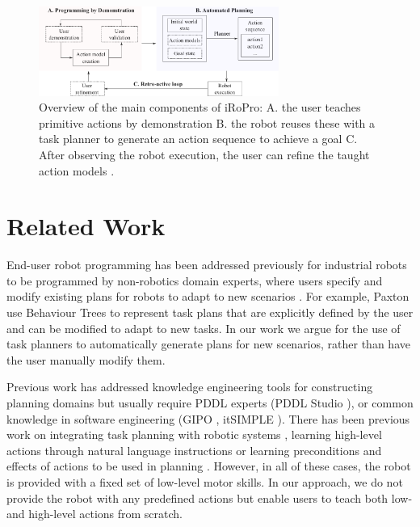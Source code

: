 \begin{figure}
	\centering
	\includegraphics[width=0.7\textwidth]{Fig5.png}
	\caption{Overview of the main components of iRoPro: A. the user teaches primitive actions by demonstration B. the robot reuses these with a task planner to generate an action sequence to achieve a goal
		C. After observing the robot execution, the user can refine the taught action models \cite{liang2017b}.}
	\label{fig:framework}
\end{figure}

\section{Related Work} \label{sec:relatedwork}
End-user robot programming has been addressed previously for industrial robots to be programmed by non-robotics domain experts, where users specify and modify existing plans for robots to adapt to new scenarios \cite{paxton2017costar,perzylo2016intuitive,stenmark2017simplified}.
For example, Paxton \etal \cite{paxton2017costar} use Behaviour Trees to represent task plans that are explicitly defined by the user and can be modified to adapt to new tasks.
In our work we argue for the use of task planners to automatically generate plans for new scenarios, rather than have the user manually modify them.

Previous work has addressed knowledge engineering tools for constructing planning domains but usually require PDDL experts (PDDL Studio \cite{plch2012inspect}), or common knowledge in software engineering (GIPO \cite{simpson2007planning}, itSIMPLE \cite{vaquero2013itsimple}).
There has been previous work on integrating task planning with robotic systems \cite{cashmore2015rosplan,kuhner2018closed}, learning high-level actions through natural language instructions \cite{she2014teaching} or learning preconditions and effects of actions to be used in planning \cite{jetchev2013learning,konidaris2018fromSkills,ugur2015bottom}.
However, in all of these cases, the robot is provided with a fixed set of low-level motor skills.
In our approach, we do not provide the robot with any predefined actions but enable users to teach both low- and high-level actions from scratch.

